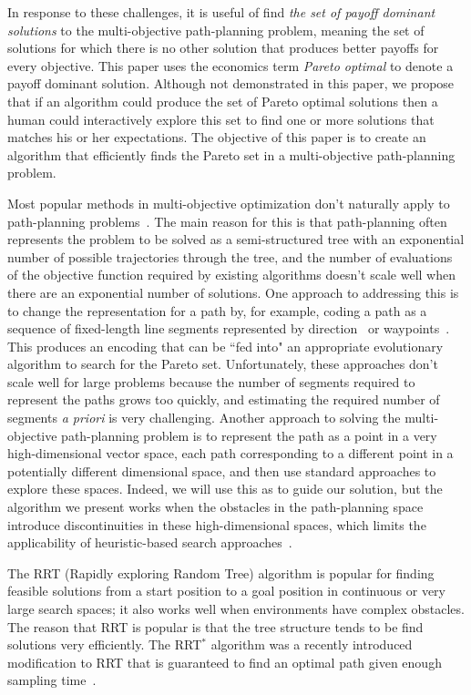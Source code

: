 \documentclass[conference]{IEEEtran}
\begin{document}
In response to these challenges, it is useful of find {\em the set of payoff dominant solutions} to the multi-objective path-planning problem, meaning the set of solutions for which there is no other solution that produces better payoffs for every objective.   
This paper uses the economics term {\em Pareto optimal} to denote a payoff dominant solution.  Although not demonstrated in this paper, we propose that if an algorithm could produce the set of Pareto optimal solutions then a human could interactively explore this set to find one or more solutions that matches his or her expectations. 
The objective of this paper is to create an algorithm that efficiently finds the Pareto set in a multi-objective path-planning problem.

Most popular methods in multi-objective optimization don't naturally apply to path-planning problems~\cite{4358754, Ahmed2013}.
The main reason for this is that path-planning often represents the problem to be solved as a semi-structured tree with an exponential number of possible trajectories through the tree, and the number of evaluations of the objective function required by existing algorithms doesn't scale well when there are an exponential number of solutions. 
One approach to addressing this is to change the representation for a path by, for example, coding a path as a sequence of fixed-length line segments represented by direction~\cite{Ahmed2013,howlett2006learning} or waypoints~\cite{5160222,Pires2004}.  
This produces an encoding that can be ``fed into" an appropriate evolutionary algorithm to search for the Pareto set. 
Unfortunately, these approaches don't scale well for large problems because the number of segments required to represent the paths grows too quickly, and estimating the required number of segments {\em a priori} is very challenging.  
Another approach to solving the multi-objective path-planning problem is to represent the path as a point in a very high-dimensional vector space, each path corresponding to a different point in a potentially different dimensional space, and then use standard approaches to explore these spaces. 
Indeed, we will use this as to guide our solution, but the algorithm we present works when the obstacles in the path-planning space introduce discontinuities in these high-dimensional spaces, which limits the applicability of heuristic-based search approaches~\cite{5160222,4358754}.

The RRT (Rapidly exploring Random Tree) algorithm is popular for finding feasible solutions from a start position to a goal position in continuous or very large search spaces; it also works well when environments have complex obstacles. 
The reason that RRT is popular is that the tree structure tends to be find solutions very efficiently.
The RRT$^{*}$ algorithm was a recently introduced modification to RRT that is guaranteed to find an optimal path given enough sampling time~\cite{Karaman:2011:SAO:2000201.2000209,Karaman.Frazzoli:RSS10}.
\end{document}
